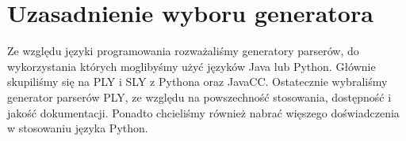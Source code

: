 \chapter{Uzasadnienie wyboru generatora}

Ze względu języki programowania rozważaliśmy generatory parserów, do wykorzystania których moglibyśmy użyć języków Java lub Python. 
Głównie skupiliśmy się na PLY i SLY z Pythona oraz JavaCC. Ostatecznie wybraliśmy generator parserów PLY, ze względu na powszechność 
stosowania, dostępność i jakość dokumentacji. Ponadto chcieliśmy również nabrać więszego doświadczenia w stosowaniu języka Python.